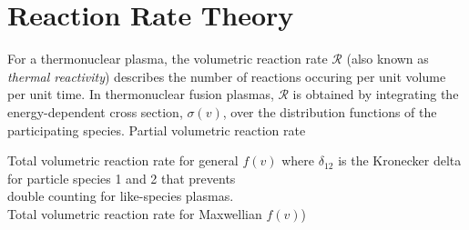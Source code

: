 {\section{Reaction Rate Theory}
For a thermonuclear plasma, the volumetric reaction rate $\mathcal{R}$
(also known as \textit{thermal reactivity}) describes the number of
reactions occuring per unit volume per unit time.  In thermonuclear
fusion plasmas, $\mathcal{R}$ is obtained by integrating the
energy-dependent cross section, $\sigma(v)$, over the distribution
functions of the participating species. 
\newline
\newline
\noindent
Partial volumetric reaction rate 

\noindent
Total volumetric reaction rate for general $f(v)$ 
\indent where $\delta_{12}$ is the Kronecker delta for particle species 1 and 2 that prevents \\
\indent double counting for like-species plasmas.\\

\noindent
Total volumetric reaction rate for Maxwellian $f(v)$)   


\vfill

\pagebreak
}
